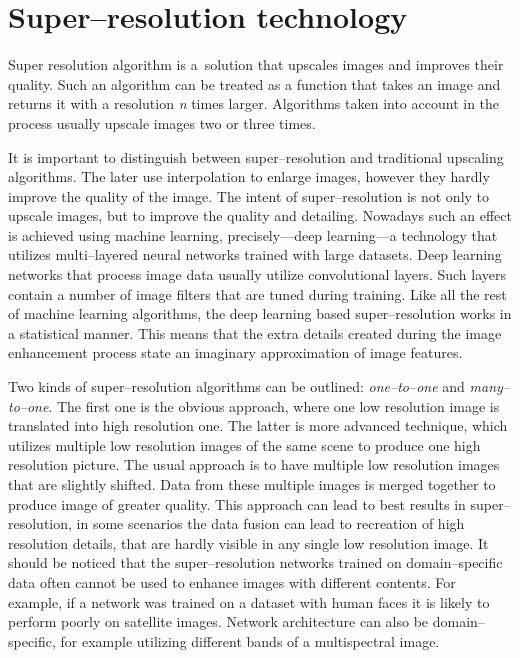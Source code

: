 \section{Super--resolution technology}
Super resolution algorithm is a~solution that upscales images and improves
their quality.
Such an algorithm can be treated as a function that takes an image and returns
it with a resolution \textit{n} times larger.
Algorithms taken into account in the process usually upscale images two or
three times.

It is important to distinguish between super--resolution and traditional
upscaling algorithms.
The later use interpolation to enlarge images, however they hardly improve the
quality of the image.
The intent of super--resolution is not only to upscale images, but to improve
the quality and detailing.
Nowadays such an effect is achieved using machine learning, precisely---deep
learning---a technology that utilizes multi--layered neural networks trained
with large datasets.
Deep learning networks that process image data usually utilize convolutional
layers.
Such layers contain a number of image filters that are tuned during training.
Like all the rest of machine learning algorithms, the deep learning based
super--resolution works in a statistical manner.
This means that the extra details created during the image enhancement process
state an imaginary approximation of image features.

Two kinds of super--resolution algorithms can be outlined:
\textit{one--to--one} and \textit{many--to--one}.
The first one is the obvious approach, where one low resolution image is
translated into high resolution one.
The latter is more advanced technique, which utilizes multiple low resolution
images of the same scene to produce one high resolution picture.
The usual approach is to have multiple low resolution images that are slightly
shifted.
Data from these multiple images is merged together to produce image of greater
quality.
This approach can lead to best results in super--resolution, in some scenarios
the data fusion can lead to recreation of high resolution details, that are
hardly visible in any single low resolution image.
It should be noticed that the super--resolution networks trained on
domain--specific data often cannot be used to enhance images with different
contents.
For example, if a network was trained on a dataset with human faces it is
likely to perform poorly on satellite images.
Network architecture can also be domain--specific, for example utilizing
different bands of a multispectral image.

